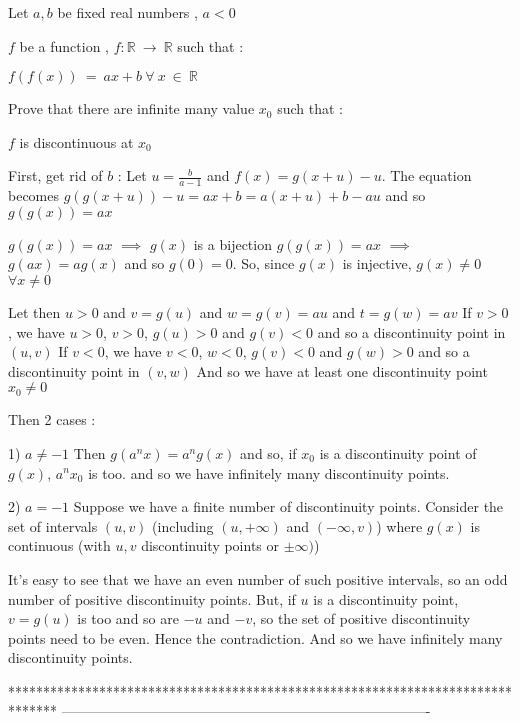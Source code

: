 \begin{solution}
	\begin{tcolorbox}\begin{italicized}Let $ a , b$ be fixed real numbers , $ a < 0$

 $ f$ be a function , $ f: \mathbb{R} \ \to \ \mathbb{R}$  such that :

   $ f(f(x)) \ = \ ax + b \ \forall \ x \ \in \ \mathbb{R}$

Prove that there are infinite many value $ x_0$ such that :

  $ f$ is discontinuous at $ x_0$\end{italicized}\end{tcolorbox}

First, get rid of $ b$ :
Let $ u=\frac{b}{a-1}$ and $ f(x)=g(x+u)-u$. The equation becomes $ g(g(x+u))-u=ax+b=a(x+u)+b-au$ and so $ g(g(x))=ax$

$ g(g(x))=ax$ $ \implies$ $ g(x)$ is a bijection
$ g(g(x))=ax$ $ \implies$ $ g(ax)=ag(x)$ and so $ g(0)=0$. So, since $ g(x)$ is injective, $ g(x)\neq 0$ $ \forall x\neq 0$

Let then $ u>0$ and $ v=g(u)$ and $ w=g(v)=au$ and $ t=g(w)=av$
If $ v>0$, we have $ u>0$, $ v>0$, $ g(u)>0$ and $ g(v)<0$ and so a discontinuity point in $ (u,v)$
If $ v<0$, we have $ v<0$, $ w<0$, $ g(v)<0$ and $ g(w)>0$ and so a discontinuity point in $ (v,w)$
And so we have at least one discontinuity point $ x_0\neq 0$

Then 2 cases :

1) $ a\neq -1$
Then $ g(a^nx)=a^ng(x)$ and so, if $ x_0$ is a discontinuity point of $ g(x)$, $ a^nx_0$ is too. and so we have infinitely many discontinuity points.

2) $ a=-1$
Suppose we have a finite number of discontinuity points.
Consider the set of intervals $ (u,v)$ (including $ (u,+\infty)$ and $ (-\infty,v)$) where $ g(x)$ is continuous (with $ u,v$ discontinuity points or $ \pm\infty)$)

It's easy to see that we have an even number of such positive intervals, so an odd number of positive discontinuity points.
But, if $ u$ is a discontinuity point, $ v=g(u)$ is too and so are $ -u$ and $ -v$, so the set of positive discontinuity points need to be even.
Hence the contradiction.
And so we have infinitely many discontinuity points.
\end{solution}
*******************************************************************************
-------------------------------------------------------------------------------


